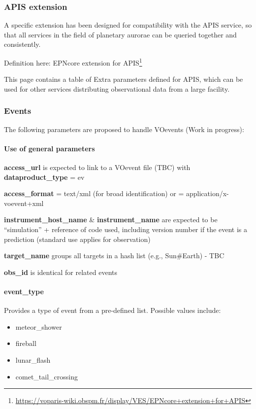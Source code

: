 \documentclass[11pt,a4paper]{ivoa}
\begin{document}
\subsubsection{APIS extension\\}

A specific extension has been designed for compatibility with the APIS service, so that all services in the field of planetary aurorae can be queried together and consistently.

Definition here: EPNcore extension for APIS\footnote{\url{https://voparis-wiki.obspm.fr/display/VES/EPNcore+extension+for+APIS}}

This page contains a table of Extra parameters defined for APIS, which can be used for other services distributing observational data from a large facility.

\subsubsection{Events\\}

The following parameters are proposed to handle VOevents (Work in progress):

\paragraph{Use of general parameters\textbf{ }}


\textbf{access\_url} is expected to link to a VOevent file (TBC) with \textbf{dataproduct\_type} = ev 

\textbf{access\_format} = text/xml (for broad identification) or = application/x-voevent+xml 

\textbf{instrument\_host\_name }\& \textbf{instrument\_name} are expected to be ``simulation'' + reference of code used, including version number if the event is a prediction (standard use applies for observation)

\textbf{target\_name} groups all targets in a hash list (e.g., Sun\#Earth) - TBC

\textbf{obs\_id} is identical for related events

\paragraph{event\_type}

Provides a type of event from a pre-defined list. Possible values include:

\begin{itemize}

\item meteor\_shower

\item fireball

\item lunar\_flash

\item comet\_tail\_crossing

\end{itemize}
\end{document}

